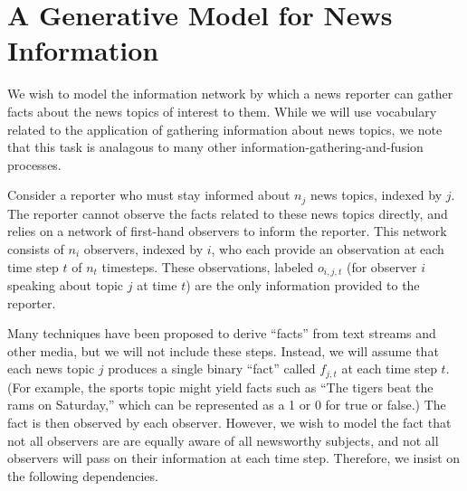 \documentclass[11pt]{article}
\begin{document}
    \hypertarget{a-generative-model-for-news-information}{%
\section{A Generative Model for News
Information}\label{a-generative-model-for-news-information}}

We wish to model the information network by which a news reporter can
gather facts about the news topics of interest to them. While we will
use vocabulary related to the application of gathering information about
news topics, we note that this task is analagous to many other
information-gathering-and-fusion processes.

Consider a reporter who must stay informed about \(n_j\) news topics,
indexed by \(j\). The reporter cannot observe the facts related to these
news topics directly, and relies on a network of first-hand observers to
inform the reporter. This network consists of \(n_i\) observers, indexed
by \(i\), who each provide an observation at each time step \(t\) of
\(n_t\) timesteps. These observations, labeled \(o_{i,j,t}\) (for
observer \(i\) speaking about topic \(j\) at time \(t\)) are the only
information provided to the reporter.

Many techniques have been proposed to derive ``facts'' from text streams
and other media, but we will not include these steps. Instead, we will
assume that each news topic \(j\) produces a single binary ``fact''
called \(f_{j,t}\) at each time step \(t\). (For example, the sports
topic might yield facts such as ``The tigers beat the rams on
Saturday,'' which can be represented as a 1 or 0 for true or false.) The
fact is then observed by each observer. However, we wish to model the
fact that not all observers are are equally aware of all newsworthy
subjects, and not all observers will pass on their information at each
time step. Therefore, we insist on the following dependencies.
\end{document}
